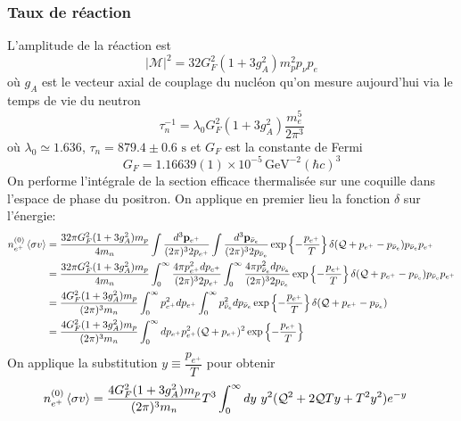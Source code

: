 \documentclass{article}
\numberwithin{equation}{section}
\begin{document}
\subsubsection{Taux de réaction}
L'amplitude de la réaction est
\begin{equation}\label{eq:AmpReaction} 
        |\mathcal{M}|^{2} = 32 G_F^2(1 + 3g_A^2)m_p^2p_{\nu}p_e
\end{equation} 
où $g_A$ est le vecteur axial de couplage du nucléon qu'on mesure 
aujourd'hui via le temps de vie du neutron
\[
        \tau_n^{-1} = \lambda_0G_F^2(1 + 3g_A^2) \frac{m_e^5}{2\pi^3}
\]
où $\lambda_0 \simeq 1.636$, $\tau_n = 879.4 \pm 0.6\,\, \text{s}$ et 
$G_F$ est la constante de Fermi
\[
        G_F = 1.16639(1) \times 10^{-5}\, \text{GeV}^{-2} (\hbar c)^{3}
\]
On performe 
l'intégrale de la section efficace thermalisée sur une 
coquille dans l'espace de phase du positron. On applique en 
premier lieu la fonction $\delta $ sur l'énergie:
\begingroup
\allowdisplaybreaks
\begin{align*}
        n_{e^{+}}^{(0)}\expval{\sigma v} &= 
        \frac{32\pi G_F^2(1 + 3g_A^2) m_p}{ 4m_n}
        \int \frac{d^{3}\mathbf{p}_{e^{+}}}{(2\pi)^{3}2p_{e^{+}}}
        \int \frac{d^{3}\mathbf{p}_{\bar{\nu}_e}}{(2\pi)^{3}2p_{\bar{\nu}_e}}
        \exp \left\{ - \frac{p_{e^{+}}}{T} \right\}
        \delta(\mathcal{Q} + p_{e^{+}} - p_{\bar{\nu}_e})
        p_{\bar{\nu}_e} p_{e^{+}} \\
        &= 
        \frac{32\pi G_F^2(1 + 3g_A^2) m_p}{ 4m_n}
        \int_0^{\infty } \frac{4 \pi p^2_{e^{+}} dp_{e^{+}}}{(2\pi)^{3}2p_{e^{+}}}
        \int_0^{\infty } \frac{4 \pi p^2_{\bar{\nu}_e} dp_{\bar{\nu}_e}}{(2\pi)^{3}2p_{\bar{\nu}_e}}
        \exp \left\{ - \frac{p_{e^{+}}}{T} \right\}
        \delta(\mathcal{Q} + p_{e^{+}} - p_{\bar{\nu}_e})
        p_{\bar{\nu}_e} p_{e^{+}} \\
        &= 
        \frac{4 G_F^2(1 + 3g_A^2) m_p}{ (2\pi)^{3}m_n}
        \int_0^{\infty }  p^2_{e^{+}} dp_{e^{+}}
        \int_0^{\infty }  p^2_{\bar{\nu}_e} dp_{\bar{\nu}_e}
        \exp \left\{ - \frac{p_{e^{+}}}{T} \right\}
        \delta(\mathcal{Q} + p_{e^{+}} - p_{\bar{\nu}_e})
        \\
        &= 
        \frac{4 G_F^2(1 + 3g_A^2) m_p}{ (2\pi)^{3}m_n}
        \int_0^{\infty }  dp_{e^{+}} p^2_{e^{+}} 
        (\mathcal{Q} + p_{e^{+}})^2
        \exp \left\{ - \frac{p_{e^{+}}}{T} \right\}
\end{align*}
\endgroup
On applique la substitution $y \equiv \dfrac{p_{e^{+}}}{T}$ pour obtenir
\begin{align*}
        n_{e^{+}}^{(0)}\expval{\sigma v} &= 
        \frac{4 G_F^2(1 + 3g_A^2) m_p}{ (2\pi)^{3}m_n}T^3
        \int_0^{\infty }  dy\,\, y^2  (\mathcal{Q}^2 + 2\mathcal{Q}Ty + T^2y^2)
        e^{-y}
\end{align*}
\end{document}
